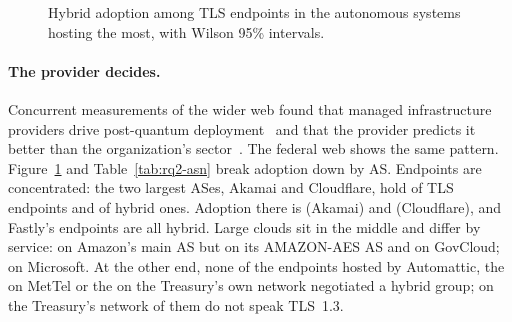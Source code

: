 \begin{figure}[t]
\centering

\caption{Hybrid adoption among TLS endpoints in the
 autonomous systems hosting the most, with Wilson
95\% intervals.}
\label{fig:rq2-asn}
\end{figure}

\begin{table}[t]
\centering\small

\caption{TLS endpoints by autonomous system: those that negotiated a hybrid
group (Hyb.), a classical TLS~1.3 group (Cl.) or no TLS~1.3 ($\le$1.2), for
the  ASes hosting the most, which hold
 of TLS endpoints.}
\label{tab:rq2-asn}
\end{table}

\paragraph{The provider decides.} Concurrent measurements of the wider web
found that managed infrastructure providers drive post-quantum
deployment~\cite{wickramasinghe2026} and that the provider predicts it
better than the organization's sector~\cite{loizou2026}. The federal web shows
the same pattern. Figure~\ref{fig:rq2-asn} and
Table~\ref{tab:rq2-asn} break adoption down by AS. Endpoints are
concentrated: the two largest ASes, Akamai and Cloudflare, hold
 of TLS endpoints and 
of hybrid ones. Adoption there is  (Akamai) and
 (Cloudflare), and Fastly's
 endpoints are all hybrid. Large clouds sit in the
middle and differ by service:  on Amazon's main AS
but  on its AMAZON-AES AS and
 on GovCloud;  on Microsoft.
At the other end, none of the  endpoints hosted by
Automattic, the  on MetTel or the
 on the Treasury's own network negotiated a hybrid
group; on the Treasury's network  of them do
not speak TLS~1.3.

